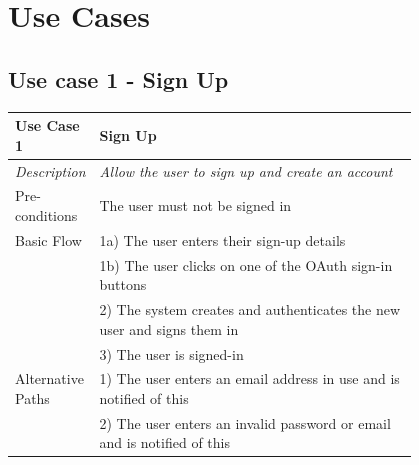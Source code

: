 \documentclass[12pt]{article}
\begin{document}
	
	\pagebreak
	\printbibliography
	\pagebreak
	
	\appendix
	\appendixpage
	\section{Use Cases}
	\label{chap:use-cases}
		
	\subsection{Use case 1 - Sign Up}
	\label{chap:use-cases-1}
	\begin{table}[H]
		\begin{tabular}{|l|p{0.8\linewidth}}
			\hline
			\rowcolor[HTML]{EFEFEF} 
			\textbf{Use Case 1}  & \textbf{Sign Up}                                                        \\ \hline
			\rowcolor[HTML]{F5FBFF} 
			\textit{Description} & \textit{Allow the user to sign up and create an account}                \\ \hline
			\rowcolor[HTML]{EFEFEF} 
			Pre-conditions       & The user must not be signed in                                          \\ \hline
			\rowcolor[HTML]{F5FBFF} 
			Basic Flow           & 1a) The user enters their sign-up details                               \\
			\rowcolor[HTML]{F5FBFF} 
			& 1b) The user clicks on one of the OAuth sign-in buttons                 \\
			\rowcolor[HTML]{F5FBFF} 
			& 2) The system creates and authenticates the new user and signs them in  \\
			\rowcolor[HTML]{F5FBFF} 
			& 3) The user is signed-in                                                \\ \hline
			\rowcolor[HTML]{EFEFEF} 
			Alternative Paths    & 1) The user enters an email address in use and is notified of this      \\
			\rowcolor[HTML]{EFEFEF} 
			& 2) The user enters an invalid password or email and is notified of this \\ \hline
		\end{tabular}
	\end{table}
\end{document}
